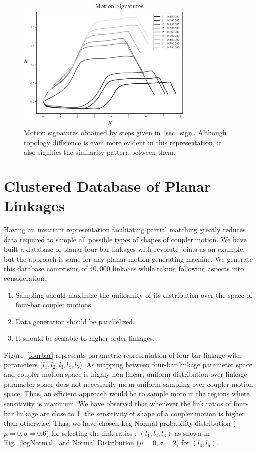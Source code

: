 \documentclass[twocolumn,10pt]{asme2ej}
\begin{document}
\begin{figure}
\centering
\includegraphics[width=240pt]{figure/fig_sa_motion_signatures.eps}
  \caption{Motion signatures obtained by steps given in~\ref{sec_sign}. Although topology difference is even more evident in this representation, it also signifies the similarity pattern between them.}
\label{saMotionSignatures}
\end{figure}

\section{Clustered Database of Planar Linkages}\label{sec_db_ae}
Having an invariant representation facilitating partial matching greatly reduces data required to sample all possible types of shapes of coupler motion.
We have built a database of planar four-bar linkages with revolute joints as an example, but the approach is same for any planar motion generating machine.
We generate this database comprising of $40,000$ linkages while taking following aspects into consideration.
\begin{enumerate}
  \item Sampling should maximize the uniformity of its distribution over the space of four-bar coupler motions.
  \item Data generation should be parallelized.
  \item It should be scalable to higher-order linkages.
\end{enumerate}
Figure~\ref{fourbar} represents parametric representation of four-bar linkage with parameters ($l_1,l_2,l_3,l_4,l_5$).
As mapping between four-bar linkage parameter space and coupler motion space is highly non-linear, uniform distribution over linkage parameter space does not necessarily mean uniform sampling over coupler motion space.
Thus, an efficient approach would be to sample more in the regions where sensitivity is maximum.
We have observed that whenever the link ratios of four-bar linkage are close to 1, the sensitivity of shape of a coupler motion is higher than otherwise.
Thus, we have chosen Log-Normal probability distribution ($\mu = 0,\sigma = 0.6 $) for selecting the link ratios : $(l_1, l_2, l_3)$ as shown in Fig.~\ref{logNormal}, and Normal Distribution ($\mu = 0,\sigma = 2 $) for $(l_4, l_5)$.
\end{document}
